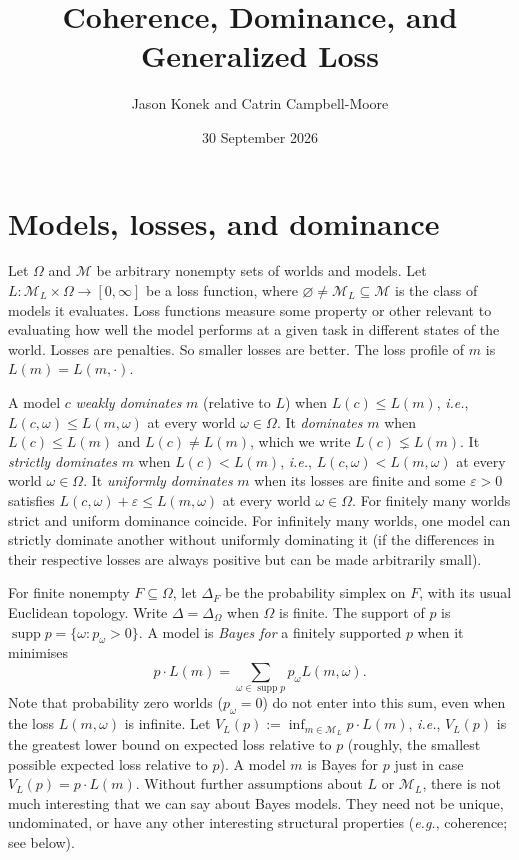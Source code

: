\documentclass[11pt]{article}
\title{Coherence, Dominance, and Generalized Loss}
\author{Jason Konek and Catrin Campbell-Moore}
\date{30 September 2026}
\theoremstyle{definition}
\theoremstyle{remark}
\newcommand{\M}{\mathcal M}
\newcommand{\supp}{\operatorname{supp}}
\begin{document}
\maketitle


\section{Models, losses, and dominance}\label{sec:setting}
Let $\Omega$ and $\M$ be arbitrary nonempty sets of worlds and models. Let $L:\M_L\times\Omega\to[0,\infty]$ be a loss function, where $\varnothing\ne\M_L\subseteq\M$ is the class of models it evaluates. Loss functions measure some property or other relevant to evaluating how well the model performs at a given task in different states of the world. Losses are penalties. So smaller losses are better. The loss profile of $m$ is $L(m)=L(m,\cdot)$.

A model $c$ \emph{weakly dominates} $m$ (relative to $L$) when $L(c)\le L(m)$, \textit{i.e.}, $L(c,\omega)\le L(m,\omega)$ at every world $\omega\in\Omega$. It \emph{dominates} $m$ when $L(c)\le L(m)$ and $L(c)\neq L(m)$, which we write $L(c)\lneq L(m)$. It \emph{strictly dominates} $m$ when $L(c)< L(m)$, \textit{i.e.}, $L(c,\omega)< L(m,\omega)$ at every world $\omega\in\Omega$. It \emph{uniformly dominates} $m$ when its losses are finite and some $\varepsilon>0$ satisfies $L(c,\omega)+\varepsilon\le L(m,\omega)$ at every world $\omega\in\Omega$. For finitely many worlds strict and uniform dominance coincide. For infinitely many worlds, one model can strictly dominate another without uniformly dominating it (if the differences in their respective losses are always positive but can be made arbitrarily small).


For finite nonempty $F\subseteq\Omega$, let $\Delta_F$ be the probability simplex on $F$, with its usual Euclidean topology. Write $\Delta=\Delta_\Omega$ when $\Omega$ is finite. The support of $p$ is $\supp p=\{\omega:p_\omega>0\}$. A model is \emph{Bayes for} a finitely supported $p$ when it minimises
\[
 p\cdot L(m)=\sum_{\omega\in\supp p}p_\omega L(m,\omega).
\]
Note that probability zero worlds ($p_\omega=0$) do not enter into this sum, even when the loss $L(m,\omega)$ is infinite. Let $V_L(p):=\inf_{m\in\M_L}p\cdot L(m)$, \textit{i.e.}, $V_L(p)$ is the greatest lower bound on expected loss relative to $p$ (roughly, the smallest possible expected loss relative to $p$). A model $m$ is Bayes for $p$ just in case $V_L(p)=p\cdot L(m)$. Without further assumptions about $L$ or $\M_L$, there is not much interesting that we can say about Bayes models. They need not be unique, undominated, or have any other interesting structural properties (\textit{e.g.}, coherence; see below).
\end{document}
